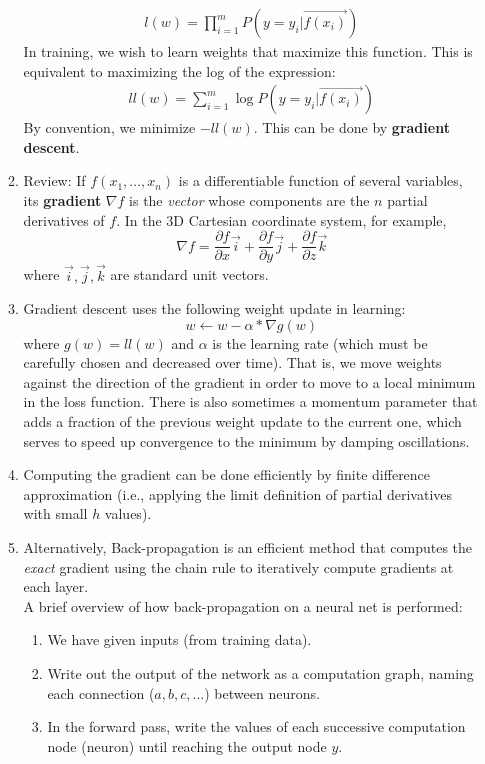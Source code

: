 \documentclass[10pt]{article}
\begin{document}
\begin{multicols}{2}
\begin{enumerate}
\begin{enumerate}
        \begin{align*}
            l(w) = \prod_{i=1}^m P(y = y_i | \vec{f(x_i)})
        \end{align*}
        In training, we wish to learn weights that maximize this function. This is equivalent to maximizing the log of the expression:
        \begin{align*}
            ll(w) = \sum_{i=1}^m \log P(y = y_i | \vec{f(x_i)})
        \end{align*}
        By convention, we minimize $-ll(w)$. This can be done by \textbf{gradient descent}.
        \item Review: If $f(x_1, \ldots, x_n)$ is a differentiable function of several variables, its \textbf{gradient} $\nabla f$ is the \textit{vector} whose components are the $n$ partial derivatives of $f$. In the 3D Cartesian coordinate system, for example, $$\nabla f = \frac{\partial f}{\partial x}\vec{i} + \frac{\partial f}{\partial y}\vec{j} + \frac{\partial f}{\partial z}\vec{k}$$ where $\vec{i},\vec{j},\vec{k}$ are standard unit vectors. 
        \item Gradient descent uses the following weight update in learning:
        $$ w \leftarrow w - \alpha * \nabla g(w) $$ where $g(w) = ll(w)$ and $\alpha$ is the learning rate (which must be carefully chosen and decreased over time). That is, we move weights against the direction of the gradient in order to move to a local minimum in the loss function. There is also sometimes a momentum parameter that adds a fraction of the previous weight update to the current one, which serves to speed up convergence to the minimum by damping oscillations.
        \item Computing the gradient can be done efficiently by finite difference approximation (i.e., applying the limit definition of partial derivatives with small $h$ values). 
        \item Alternatively, Back-propagation is an efficient method that computes the \textit{exact} gradient using the chain rule to iteratively compute gradients at each layer. \\
        A brief overview of how back-propagation on a neural net is performed:
        \begin{enumerate}
            \item We have given inputs (from training data).
            \item Write out the output of the network as a computation graph, naming each connection ($a,b,c,\ldots$) between neurons.
            \item In the forward pass, write the values of each successive computation node (neuron) until reaching the output node $y$. 

\end{enumerate}
\end{enumerate}
\end{enumerate}
\end{multicols}
\end{document}
